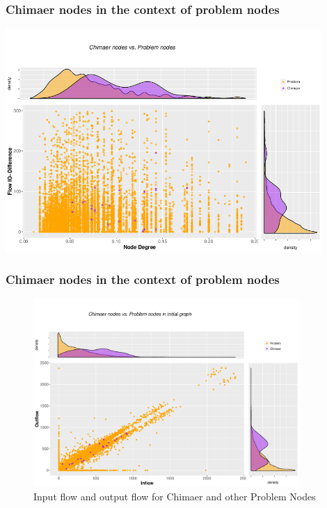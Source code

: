 \documentclass[10pt, compress]{beamer}
\begin{document}
\begin{frame}[fragile]
	\frametitle{Chimaer nodes in the context of problem nodes}
	\includegraphics[width=0.9\textwidth]{degree_flowdifference_zoomed_finer.png}
\end{frame}
\begin{frame}[fragile]
	\frametitle{Chimaer nodes in the context of problem nodes}
	\begin{figure}
	\includegraphics[width=0.9\textwidth]{Inflow_Outflow.pdf}
	\caption{Input flow and output flow for Chimaer and other Problem Nodes}
	\end{figure}
\end{frame}
\end{document}
